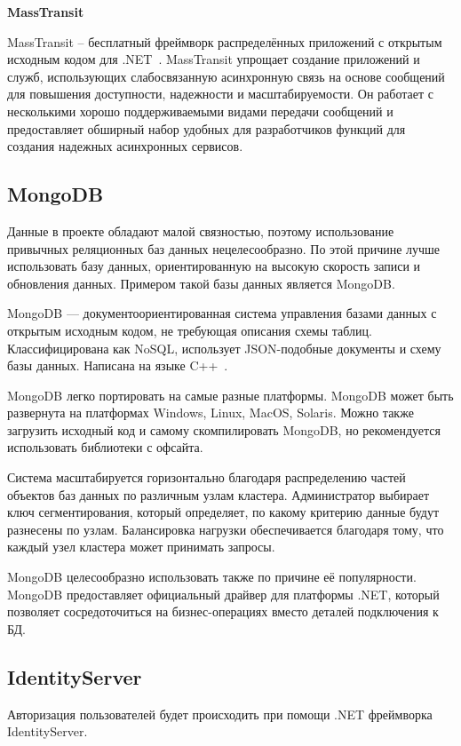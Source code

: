 \bigskip
\textbf{MassTransit}

MassTransit – бесплатный фреймворк распределённых приложений с открытым исходным кодом для .NET~\cite{mass_transit}. MassTransit упрощает создание приложений и служб, использующих слабосвязанную асинхронную связь на основе сообщений для повышения доступности, надежности и масштабируемости. Он работает с несколькими хорошо поддерживаемыми видами передачи сообщений и предоставляет обширный набор удобных для разработчиков функций для создания надежных асинхронных сервисов.


\subsection{MongoDB}

Данные в проекте обладают малой связностью, поэтому использование привычных реляционных баз данных нецелесообразно. По этой причине лучше использовать базу данных, ориентированную на высокую скорость записи и обновления данных. Примером такой базы данных является MongoDB.

MongoDB — документоориентированная система управления базами данных с открытым исходным кодом, не требующая описания схемы таблиц. Классифицирована как NoSQL, использует JSON-подобные документы и схему базы данных. Написана на языке C++~\cite{mongo}.

MongoDB легко портировать на самые разные платформы. MongoDB может быть развернута на платформах Windows, Linux, MacOS, Solaris. Можно также загрузить исходный код и самому скомпилировать MongoDB, но рекомендуется использовать библиотеки с офсайта.

Система масштабируется горизонтально благодаря распределению частей объектов баз данных по различным узлам кластера. Администратор выбирает ключ сегментирования, который определяет, по какому критерию данные будут разнесены по узлам. Балансировка нагрузки обеспечивается благодаря тому, что каждый узел кластера может принимать запросы.

MongoDB целесообразно использовать также по причине её популярности. MongoDB предоставляет официальный драйвер для платформы .NET, который позволяет сосредоточиться на бизнес-операциях вместо деталей подключения к БД.


\subsection{IdentityServer}

Авторизация пользователей будет происходить при помощи .NET фреймворка IdentityServer.

